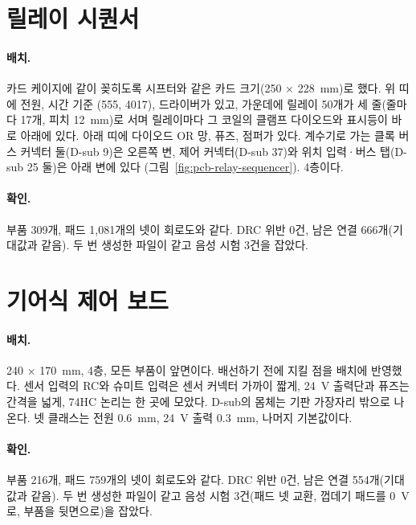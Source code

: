 \section{릴레이 시퀀서}\label{pcb:sequencer}

\paragraph{배치.} 카드 케이지에 같이 꽂히도록 시프터와 같은 카드 크기(250 × 228~mm)로 했다. 위 띠에 전원, 시간 기준
(555, 4017), 드라이버가 있고, 가운데에 릴레이 50개가 세 줄(줄마다 17개, 피치 12~mm)로 서며 릴레이마다 그 코일의
클램프 다이오드와 표시등이 바로 아래에 있다. 아래 띠에 다이오드 OR 망, 퓨즈, 점퍼가 있다. 계수기로 가는 클록 버스
커넥터 둘(D-sub 9)은 오른쪽 변, 제어 커넥터(D-sub 37)와 위치 입력·버스 탭(D-sub 25 둘)은 아래 변에 있다
(그림~\ref{fig:pcb-relay-sequencer}). 4층이다.

\paragraph{확인.} 부품 309개, 패드 1,081개의 넷이 회로도와 같다. DRC 위반 0건, 남은 연결 666개(기대값과 같음).
두 번 생성한 파일이 같고 음성 시험 3건을 잡았다.


\section{기어식 제어 보드}\label{pcb:gear-control}

\paragraph{배치.} 240 × 170~mm, 4층, 모든 부품이 앞면이다. 배선하기 전에 지킬 점을 배치에 반영했다. 센서 입력의 RC와
슈미트 입력은 센서 커넥터 가까이 짧게, 24~V 출력단과 퓨즈는 간격을 넓게, 74HC 논리는 한 곳에 모았다. D-sub의 몸체는
기판 가장자리 밖으로 나온다. 넷 클래스는 전원 0.6~mm, 24~V 출력 0.3~mm, 나머지 기본값이다.

\paragraph{확인.} 부품 216개, 패드 759개의 넷이 회로도와 같다. DRC 위반 0건, 남은 연결 554개(기대값과 같음). 두 번 생성한
파일이 같고 음성 시험 3건(패드 넷 교환, 껍데기 패드를 0~V로, 부품을 뒷면으로)을 잡았다.

